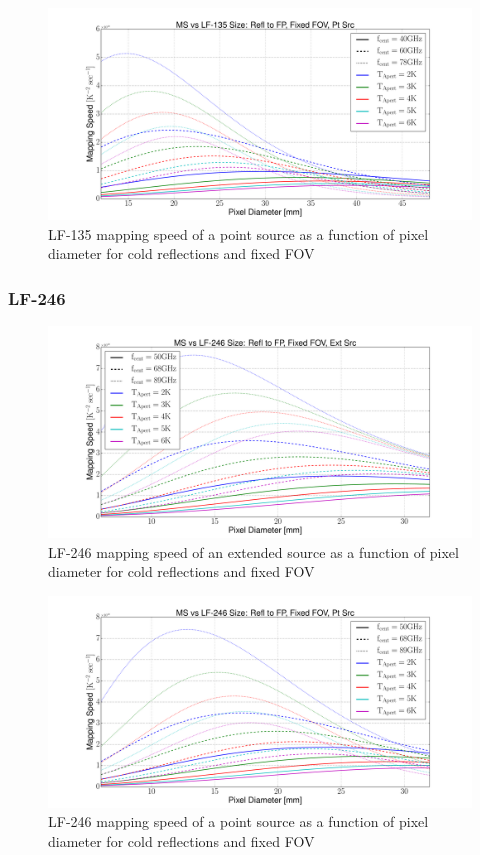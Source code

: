 \documentclass[12pt, titlepage]{article} %
\begin{document}
\begin{figure}[H]
	\centering
	\includegraphics[width=1.1\textwidth, center]{PDF/LFT_MS_LF-135_coldRefl_fixFOV_ptSrc.pdf}
	\caption{LF-135 mapping speed of a point source as a function of pixel diameter for cold reflections and fixed FOV}
\end{figure}


\subsubsection{LF-246}

\begin{figure}[H]
	\centering
	\includegraphics[width=1.1\textwidth, center]{PDF/LFT_MS_LF-246_coldRefl_fixFOV_extSrc.pdf}
	\caption{LF-246 mapping speed of an extended source as a function of pixel diameter for cold reflections and fixed FOV}
\end{figure}

\begin{figure}[H]
	\centering
	\includegraphics[width=1.1\textwidth, center]{PDF/LFT_MS_LF-246_coldRefl_fixFOV_ptSrc.pdf}
	\caption{LF-246 mapping speed of a point source as a function of pixel diameter for cold reflections and fixed FOV}
\end{figure}
\end{document}
